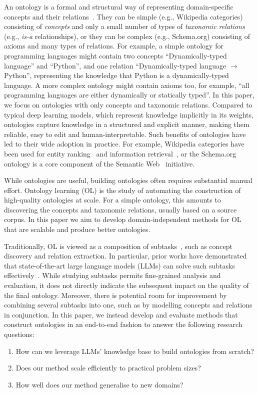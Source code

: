 \documentclass{article}
\begin{document}
An ontology is a formal and structural way of representing domain-specific concepts and their relations~\cite{gruber1995toward}.
They can be simple (e.g., Wikipedia categories) consisting of \emph{concepts} and only a small number of types of \emph{taxonomic relations} (e.g., \emph{is-a} relationships), or they can be complex (e.g., Schema.org) consisting of axioms and many types of relations. For example, a simple ontology for programming languages might contain two concepts ``Dynamically-typed language'' and ``Python'', and one relation ``Dynamically-typed language $\to$ Python'', representing the knowledge that Python is a dynamically-typed language. A more complex ontology might contain axioms too, for example, ``all programming languages are either dynamically or statically typed''.
In this paper, we focus on ontologies with only concepts and taxonomic relations. Compared to typical deep learning models, which represent knowledge implicitly in its weights, ontologies capture knowledge in a structured and explicit manner, making them reliable, easy to edit and human-interpretable. Such benefits of ontologies have led to their wide adoption in practice. For example, Wikipedia categories have been used for entity ranking~\cite{vercoustre2008using} and information retrieval~\cite{sorg2012exploiting}, or the Schema.org~\cite{Schema.org_2011} ontology is a core component of the Semantic Web~\cite{antoniou2004semantic} initiative.

While ontologies are useful, building ontologies often requires substantial manual effort. Ontology learning (OL) is the study of automating the construction of high-quality ontologies at scale. For a simple ontology, this amounts to discovering the concepts and taxonomic relations, usually based on a source corpus. In this paper we aim to develop domain-independent methods for OL that are scalable and produce better ontologies.

Traditionally, OL is viewed as a composition of subtasks~\cite{asim2018survey}, such as concept discovery and relation extraction. In particular, prior works have demonstrated that state-of-the-art large language models (LLMs) can solve such subtasks effectively~\cite{babaei2023llms4ol}. While studying subtasks permits fine-grained analysis and evaluation, it does not directly indicate the subsequent impact on the quality of the final ontology. Moreover, there is potential room for improvement by combining several subtasks into one, such as by modelling concepts and relations in conjunction. In this paper, we instead develop and evaluate methods that construct ontologies in an end-to-end fashion to answer the following research questions:
\begin{enumerate}[itemsep=0pt,leftmargin=*]
    \item How can we leverage LLMs' knowledge base to build ontologies from scratch?
    \item Does our method scale efficiently to practical problem sizes?
    \item How well does our method generalise to new domains?
\end{enumerate}
\end{document}

